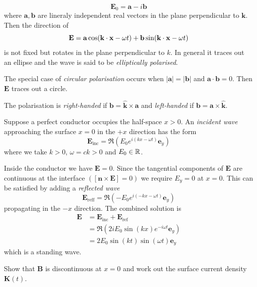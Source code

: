 \documentclass{article}
\begin{document}
\[ \mathbf E_0 = \mathbf a - i \mathbf b \]
where $ \mathbf a, \mathbf b $ are lineraly independent real vectors in the plane perpendicular to $ \mathbf k $. Then the direction of 
\[
  \mathbf E = \mathbf a \cos(\mathbf k \cdot\mathbf{x} - \omega t) +\mathbf b \sin(\mathbf k \cdot\mathbf{x}-  \omega t)
\]
is not fixed but rotates in the plane perpendicular to $ k $. In general it traces out an ellipse and the wave is said to be \textit{elliptically polarised}.\par
The special case of \textit{circular polarisation} occurs when $ |\mathbf a| = |\mathbf b| $ and $ \mathbf a \cdot\mathbf b= 0 $. Then $ \mathbf E $ traces out a circle.\par
The polarisation is \textit{right-handed} if $ \mathbf b=\hat{\mathbf k} \times\mathbf a $ and \textit{left-handed} if $ \mathbf b = \mathbf a \times{\hat{\mathbf k}} $.\par
Suppose a perfect conductor occupies the half-space $ x>0 $. An \textit{incident wave} approaching the surface $ x=0 $ in the $ +x $ direction has the form
\[
	\mathbf E_{\text{inc}} = \Re\left(E_0 e^{i(kx-\omega t)} \mathbf e_y\right)
\]
where we take $ k>0 $, $ \omega=ck>0 $ and $ E_0\in \mathbb{R} $.\par
Inside the conductor we have $ \mathbf E = 0 $. Since the tangential components of $ \mathbf E $ are continuous at the interface $ ([\mathbf n \times\mathbf E]=0) $ we require $ E_y = 0 $ at $ x=0 $. This can be satisfied by adding a \textit{reflected wave}
\[
	\mathbf E_{\text{reff}} = \Re\left(-E_0 e^{i(-kx-\omega t)}\mathbf e_y\right)
\]
propagating in the $ -x $ direction. The combined solution is
\begin{align*}
	\mathbf E &= \mathbf E_{\text{inc}} +\mathbf E_{\text{ref}} \\
		  &= \Re\left(2iE_0 \sin(kx)e^{-i\omega t} \mathbf e_y\right)\\
		  &= 2E_0 \sin(kt)\sin(\omega t) \mathbf e_y
\end{align*}
which is a standing wave.
\begin{exercise}
  Show that $ \mathbf B $ is discontinuous at $ x=0 $ and work out the surface current density $ \mathbf K(t) $.
\end{exercise}
\end{document}
